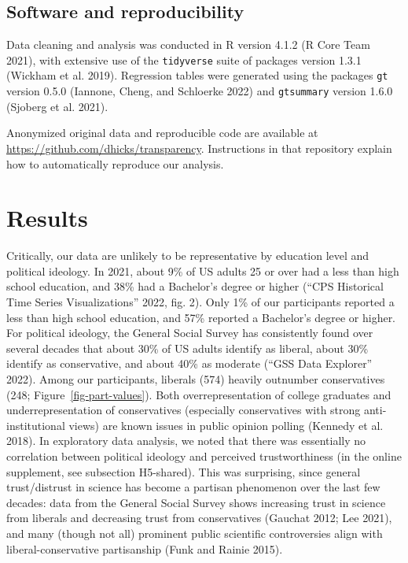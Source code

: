 \documentclass[
  letterpaper,
  DIV=11,
  numbers=noendperiod]{scrartcl}
\begin{document}
\hypertarget{software-and-reproducibility}{%
\subsection{Software and
reproducibility}\label{software-and-reproducibility}}

Data cleaning and analysis was conducted in R version 4.1.2 (R Core Team
2021), with extensive use of the \texttt{tidyverse} suite of packages
version 1.3.1 (Wickham et al. 2019). Regression tables were generated
using the packages \texttt{gt} version 0.5.0 (Iannone, Cheng, and
Schloerke 2022) and \texttt{gtsummary} version 1.6.0 (Sjoberg et al.
2021).

Anonymized original data and reproducible code are available at
\url{https://github.com/dhicks/transparency}. Instructions in that
repository explain how to automatically reproduce our analysis.

\hypertarget{results}{%
\section{Results}\label{results}}

Critically, our data are unlikely to be representative by education
level and political ideology. In 2021, about 9\% of US adults 25 or over
had a less than high school education, and 38\% had a Bachelor's degree
or higher ({``CPS Historical Time Series Visualizations''} 2022, fig.
2). Only 1\% of our participants reported a less than high school
education, and 57\% reported a Bachelor's degree or higher. For
political ideology, the General Social Survey has consistently found
over several decades that about 30\% of US adults identify as liberal,
about 30\% identify as conservative, and about 40\% as moderate ({``GSS
Data Explorer''} 2022). Among our participants, liberals (574) heavily
outnumber conservatives (248; Figure~\ref{fig-part-values}). Both
overrepresentation of college graduates and underrepresentation of
conservatives (especially conservatives with strong anti-institutional
views) are known issues in public opinion polling (Kennedy et al. 2018).
In exploratory data analysis, we noted that there was essentially no
correlation between political ideology and perceived trustworthiness (in
the online supplement, see subsection H5-shared). This was surprising,
since general trust/distrust in science has become a partisan phenomenon
over the last few decades: data from the General Social Survey shows
increasing trust in science from liberals and decreasing trust from
conservatives (Gauchat 2012; Lee 2021), and many (though not all)
prominent public scientific controversies align with
liberal-conservative partisanship (Funk and Rainie 2015).
\end{document}

